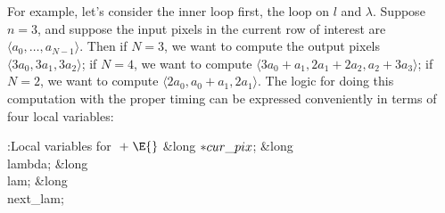 For example, let's consider the inner loop first, the loop on $l$ and
$\lambda$.  Suppose $n=3$, and suppose the input pixels in the current
row of interest are $\langle a_0,\ldots,a_{N-1}\rangle$. Then if $N=3$,
we want to compute the output pixels $\langle3a_0,3a_1,3a_2\rangle$;
if $N=4$, we want to compute
$\langle3a_0+a_1,2a_1+2a_2,a_2+3a_3\rangle$; if $N=2$, we want to
compute $\langle2a_0,a_0+a_1,2a_1\rangle$. The logic for doing this
computation with the proper timing can be expressed conveniently in
terms of four local variables:

\Y\B\4:Local variables for \X${}\mathrel+\E{}$\6
\&{long} ${}{*}\\{cur\_pix}{}$;\6
\&{long} \\{lambda};\6
\&{long} \\{lam};\6
\&{long} \\{next\_lam};\par
\fi

